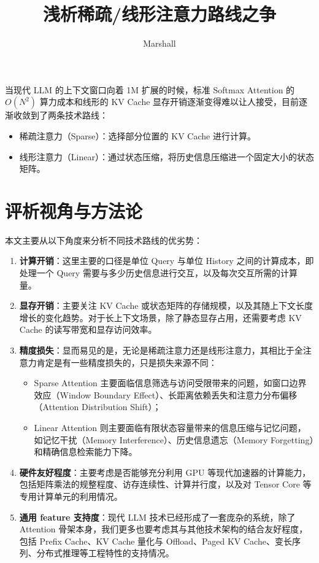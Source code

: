 \documentclass[11pt]{article}
\title{浅析稀疏/线形注意力路线之争}
\author{Marshall}
\begin{document}
\maketitle

当现代 LLM 的上下文窗口向着 1M 扩展的时候，标准 Softmax Attention 的 $O(N^2)$ 算力成本和线形的 KV Cache 显存开销逐渐变得难以让人接受，目前逐渐收敛到了两条技术路线：

\begin{itemize}
  \item 稀疏注意力（Sparse）：选择部分位置的 KV Cache 进行计算。
  \item 线形注意力（Linear）：通过状态压缩，将历史信息压缩进一个固定大小的状态矩阵。
\end{itemize}

\section{评析视角与方法论}

本文主要从以下角度来分析不同技术路线的优劣势：

\begin{enumerate}
  \item \textbf{计算开销}：这里主要的口径是单位 Query 与单位 History 之间的计算成本，即处理一个 Query 需要与多少历史信息进行交互，以及每次交互所需的计算量。
  \item \textbf{显存开销}：主要关注 KV Cache 或状态矩阵的存储规模，以及其随上下文长度增长的变化趋势。对于长上下文场景，除了静态显存占用，还需要考虑 KV Cache 的读写带宽和显存访问效率。
  \item \textbf{精度损失}：显而易见的是，无论是稀疏注意力还是线形注意力，其相比于全注意力肯定是有一些精度损失的，只是损失来源不同：
    \begin{itemize}
      \item Sparse Attention 主要面临信息筛选与访问受限带来的问题，如窗口边界效应（Window Boundary Effect）、长距离依赖丢失和注意力分布偏移（Attention Distribution Shift）；
      \item Linear Attention 则主要面临有限状态容量带来的信息压缩与记忆问题，如记忆干扰（Memory Interference）、历史信息遗忘（Memory Forgetting）和精确信息检索能力下降。
    \end{itemize}
  \item \textbf{硬件友好程度}：主要考虑是否能够充分利用 GPU 等现代加速器的计算能力，包括矩阵乘法的规整程度、访存连续性、计算并行度，以及对 Tensor Core 等专用计算单元的利用情况。
  \item \textbf{通用 feature 支持度}：现代 LLM 技术已经形成了一套庞杂的系统，除了 Attention 骨架本身，我们更多也要考虑其与其他技术架构的结合友好程度，包括 Prefix Cache、KV Cache 量化与 Offload、Paged KV Cache、变长序列、分布式推理等工程特性的支持情况。
\end{enumerate}
\end{document}
